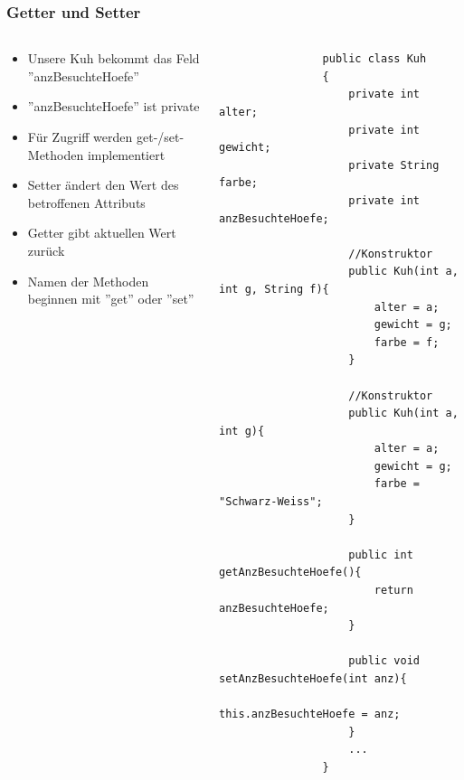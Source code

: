 \begin{frame}[fragile]
	\frametitle{Getter und Setter}
	\begin{columns}
		\begin{column}{0.5\textwidth}
			\small
			\begin{itemize}
			  \item Unsere Kuh bekommt das Feld ''anzBesuchteHoefe''
			  \item ''anzBesuchteHoefe'' ist private
			  \item F\"ur Zugriff werden get-/set-Methoden implementiert
			  \item Setter \"andert den Wert des betroffenen Attributs
			  \item Getter gibt aktuellen Wert zur\"uck
			  \item Namen der Methoden beginnen mit ''get'' oder ''set''
			\end{itemize}
		\end{column}
		\begin{column}{0.5\textwidth}
			\begin{lstlisting}
				public class Kuh
				{
					private int alter;
					private int gewicht;
					private String farbe;
					private int anzBesuchteHoefe;
					
					//Konstruktor  
					public Kuh(int a, int g, String f){
						alter = a;
						gewicht = g;
						farbe = f;
					}
					
					//Konstruktor  
					public Kuh(int a, int g){
						alter = a;
						gewicht = g;
						farbe = "Schwarz-Weiss";
					}
					
					public int getAnzBesuchteHoefe(){
						return anzBesuchteHoefe;
					}
					
					public void setAnzBesuchteHoefe(int anz){
						this.anzBesuchteHoefe = anz;
					}
					...
				} 
			\end{lstlisting}
		\end{column}
	\end{columns}
\end{frame}

